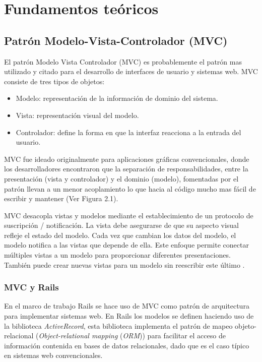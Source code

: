 \chapter{Fundamentos teóricos}

\section{Patrón Modelo-Vista-Controlador (MVC)}
El patrón Modelo Vista Controlador (MVC) es probablemente el patrón
mas utilizado y citado para el desarrollo de interfaces de usuario y sistemas web.
MVC consiste de tres tipos de objetos:

\begin{itemize}
\item Modelo: representación de la información de dominio del sistema.
\item Vista: representación visual del modelo.
\item Controlador: define la forma en que la interfaz reacciona a la entrada
  del usuario.
\end{itemize}


MVC fue ideado originalmente para aplicaciones gráficas convencionales,
donde los desarrolladores encontraron que la separación de responsabilidades,
entre la presentación (vista y controlador) y el dominio (modelo), fomentadas
por el patrón llevan a un menor acoplamiento lo que hacia al código
mucho mas fácil de escribir y mantener (Ver Figura 2.1).

MVC desacopla vistas y modelos mediante el establecimiento de un
protocolo de suscripción / notificación. La vista debe asegurarse
de que su aspecto visual refleje el estado del modelo. Cada vez que cambian
los datos del modelo, el modelo notifica a las vistas que depende de ella.
Este enfoque permite conectar múltiples vistas a un modelo para proporcionar
diferentes presentaciones. También puede crear nuevas vistas para un modelo
sin reescribir este último \cite{14_gamma_1995}.

\subsection{MVC y Rails}
En el marco de trabajo Rails se hace uso de MVC como patrón de arquitectura
para implementar sistemas web. En Rails los modelos se definen haciendo
uso de la biblioteca \textit{ActiveRecord}, esta biblioteca implementa el
patrón de mapeo objeto-relacional (\textit{Object-relational mapping}
(\textit{ORM})) para facilitar el acceso de información contenida en
bases de datos relacionales, dado que es el caso típico en sistemas web
convencionales.

